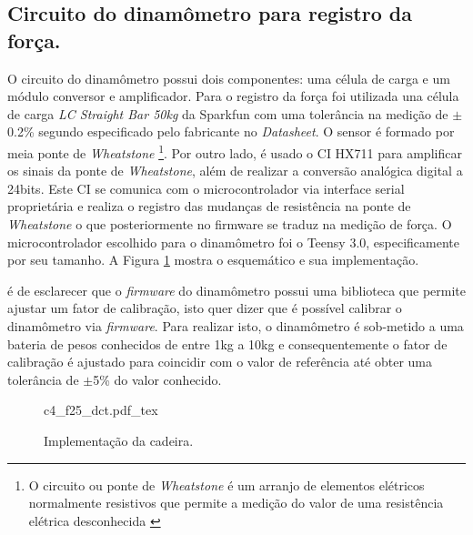 \subsection*{Circuito do dinamômetro para registro da força.}

O circuito do dinamômetro possui dois componentes: uma célula de carga e um módulo conversor e amplificador. Para o registro da força foi utilizada una célula de carga \textit{LC Straight Bar 50kg} da Sparkfun com uma tolerância na medição de $\mathrm{\pm}$0.2\% segundo especificado pelo fabricante no \textit{Datasheet}. O sensor é formado por meia ponte de \textit{Wheatstone} \footnote{O circuito ou ponte de \textit{Wheatstone} é um arranjo de elementos elétricos normalmente resistivos que permite a medição do valor de uma resistência elétrica desconhecida \cite{Boylestad2013}}. Por outro lado, é usado o \acrshort{CI} HX711 para amplificar os sinais da ponte de \textit{Wheatstone}, além de realizar a conversão analógica digital a 24bits. Este \acrshort{CI} se comunica com o microcontrolador via interface serial proprietária e realiza o registro das mudanças de resistência na ponte de \textit{Wheatstone} o que posteriormente no firmware se traduz na medição de força. O microcontrolador escolhido para o dinamômetro foi o Teensy 3.0, especificamente por seu tamanho. A Figura \ref{fig:c4_f25_dct} mostra o esquemático e sua implementação.

é de esclarecer que o \textit{firmware} do dinamômetro possui uma biblioteca que permite ajustar um fator de calibração, isto quer dizer que é possível calibrar o dinamômetro via \textit{firmware}. Para realizar isto, o dinamômetro é sob-metido a uma bateria de pesos conhecidos de entre 1kg a 10kg e consequentemente o fator de calibração é ajustado para coincidir com o valor de referência até obter uma tolerância de $\mathrm{\pm}$5\% do valor conhecido.

\begin{figure}
    \centering %
    \small %
    \def\svgwidth{0.9\columnwidth}%
    {c4_f25_dct.pdf_tex}
    \caption{Implementação da cadeira.}
    \label{fig:c4_f25_dct}
\end{figure}





